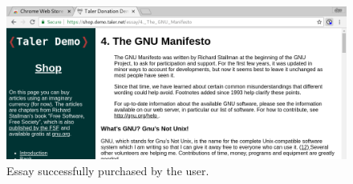 \begin{figure}
\centering
\includegraphics[width=\textwidth]{taler-screenshots/essay-done.png}
\caption{Essay successfully purchased by the user.}
\label{fig:ux:essay-done}
\end{figure}




